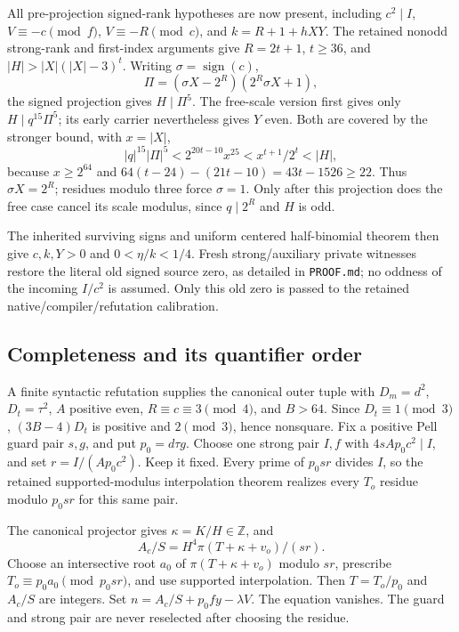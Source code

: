 \documentclass[11pt]{article}
\begin{document}
All pre-projection signed-rank hypotheses are now present, including
\(c^2\mid I\), \(V\equiv-c\pmod f\), \(V\equiv-R\pmod c\), and
\(k=R+1+hXY\). The retained nonodd strong-rank and first-index arguments
give \(R=2t+1\), \(t\ge36\), and
\( |H|>|X|(|X|-3)^t\). Writing \(\sigma=\operatorname{sign}(c)\),
\[
 \Pi=(\sigma X-2^R)(2^R\sigma X+1),
\]
the signed projection gives \(H\mid\Pi^5\). The free-scale version first
gives only \(H\mid q^{15}\Pi^5\); its early carrier nevertheless gives
\(Y\) even. Both are covered by the stronger bound, with \(x=|X|\),
\[
 |q|^{15}|\Pi|^5<2^{20t-10}x^{25}<x^{t+1}/2^t<|H|,
\]
because \(x\ge2^{64}\) and
\(64(t-24)-(21t-10)=43t-1526\ge22\).
Thus \(\sigma X=2^R\); residues modulo three force \(\sigma=1\).
Only after this projection does the free case cancel its scale modulus,
since \(q\mid2^R\) and \(H\) is odd.

The inherited surviving signs and uniform centered half-binomial theorem
then give \(c,k,Y>0\) and \(0<\eta/k<1/4\). Fresh strong/auxiliary
private witnesses restore the literal old signed source zero, as detailed
in \texttt{PROOF.md}; no oddness of the incoming \(I/c^2\) is assumed.
Only this old zero is passed to the retained native/compiler/refutation
calibration.

\subsection{Completeness and its quantifier order}
A finite syntactic refutation supplies the canonical outer tuple with
\(D_m=d^2\), \(D_t=\tau^2\), \(A\) positive even,
\(R\equiv c\equiv3\pmod4\), and \(B>64\).
Since \(D_t\equiv1\pmod3\), \((3B-4)D_t\) is positive and
\(2\pmod3\), hence nonsquare. Fix a positive Pell guard pair \(s,g\),
and put \(p_0=d\tau g\). Choose one strong pair \(I,f\) with
\(4sAp_0c^2\mid I\), and set \(r=I/(Ap_0c^2)\). Keep it fixed.
Every prime of \(p_0sr\) divides \(I\), so the retained
supported-modulus interpolation theorem realizes every \(T_o\) residue
modulo \(p_0sr\) for this same pair.

The canonical projector gives \(\kappa=K/H\in\mathbb Z\), and
\[
 A_c/S=H^4\pi(T+\kappa+v_o)/(sr).
\]
Choose an intersective root \(a_0\) of \(\pi(T+\kappa+v_o)\) modulo
\(sr\), prescribe \(T_o\equiv p_0a_0\pmod{p_0sr}\), and use supported
interpolation. Then \(T=T_o/p_0\) and \(A_c/S\) are integers. Set
\(n=A_c/S+p_0fy-\lambda V\). The equation vanishes. The guard and
strong pair are never reselected after choosing the residue.
\end{document}
